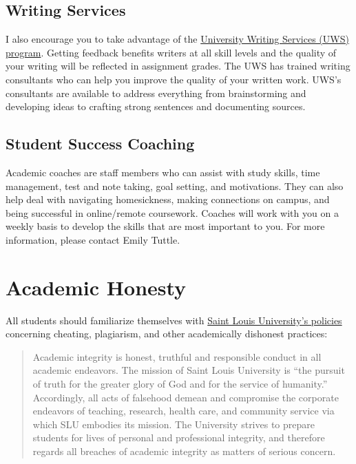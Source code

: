 \documentclass[
]{book}
\begin{document}
\hypertarget{writing-services}{%
\subsection{Writing Services}\label{writing-services}}

I also encourage you to take advantage of the \href{https://www.slu.edu/life-at-slu/student-success-center/academic-support/university-writing-services/index.php}{University Writing Services (UWS) program}. Getting feedback benefits writers at all skill levels and the quality of your writing will be reflected in assignment grades. The UWS has trained writing consultants who can help you improve the quality of your written work. UWS's consultants are available to address everything from brainstorming and developing ideas to crafting strong sentences and documenting sources.

\hypertarget{student-success-coaching}{%
\subsection{Student Success Coaching}\label{student-success-coaching}}

Academic coaches are staff members who can assist with study skills, time management, test and note taking, goal setting, and motivations. They can also help deal with navigating homesickness, making connections on campus, and being successful in online/remote coursework. Coaches will work with you on a weekly basis to develop the skills that are most important to you. For more information, please contact Emily Tuttle.

\hypertarget{academic-honesty}{%
\section{Academic Honesty}\label{academic-honesty}}

All students should familiarize themselves with \href{http://www.slu.edu/Documents/provost/academic_affairs/Academic\%20Integrity\%20Policy\%20FINAL\%20\%206-26-15.pd}{Saint Louis University's policies} concerning cheating, plagiarism, and other academically dishonest practices:

\begin{quote}
Academic integrity is honest, truthful and responsible conduct in all academic endeavors. The mission of Saint Louis University is ``the pursuit of truth for the greater glory of God and for the service of humanity.'' Accordingly, all acts of falsehood demean and compromise the corporate endeavors of teaching, research, health care, and community service via which SLU embodies its mission. The University strives to prepare students for lives of personal and professional integrity, and therefore regards all breaches of academic integrity as matters of serious concern.
\end{quote}
\end{document}
